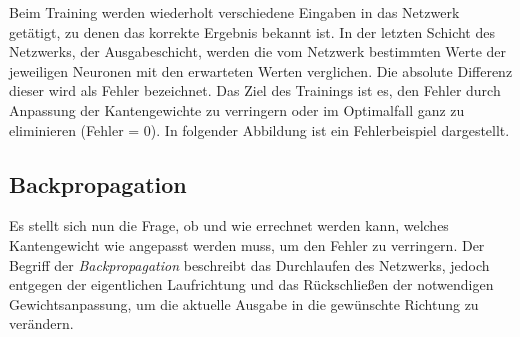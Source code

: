 Beim Training werden wiederholt verschiedene Eingaben in das Netzwerk getätigt,
zu denen das korrekte Ergebnis bekannt ist. In der letzten Schicht des Netzwerks,
der Ausgabeschicht, werden die vom Netzwerk bestimmten Werte der jeweiligen
Neuronen mit den erwarteten Werten verglichen.
Die absolute Differenz dieser wird als Fehler bezeichnet.
Das Ziel des Trainings ist es, den Fehler durch Anpassung der Kantengewichte zu
verringern oder im Optimalfall ganz zu eliminieren (Fehler = 0).
In folgender Abbildung ist ein Fehlerbeispiel dargestellt.\bigskip

\begin{figure}[H]
    \centering
\end{figure}

\subsection{Backpropagation}

Es stellt sich nun die Frage, ob und wie errechnet werden kann, welches
Kantengewicht wie angepasst werden muss, um den Fehler zu verringern.
Der Begriff der \emph{Backpropagation} beschreibt das Durchlaufen des Netzwerks,
jedoch entgegen der eigentlichen Laufrichtung und das Rückschließen der
notwendigen Gewichtsanpassung, um die aktuelle Ausgabe in die gewünschte
Richtung zu verändern.

